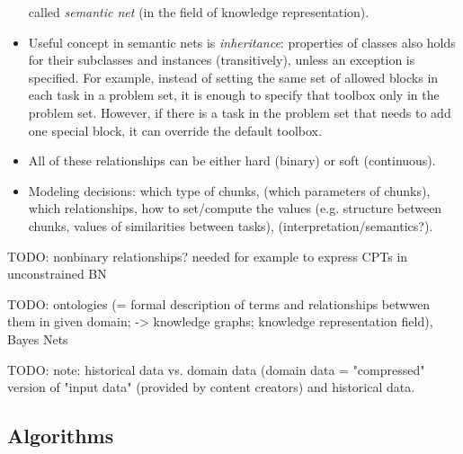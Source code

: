 \begin{itemize}
  called \emph{semantic net} (in the field of knowledge representation).
\item Useful concept in semantic nets is \emph{inheritance}:
  properties of classes also holds for their subclasses and instances (transitively),
  unless an exception is specified.
  For example, instead of setting the same set of allowed blocks in each task
    in a problem set, it is enough to specify that toolbox only in the problem set.
    However, if there is a task in the problem set that needs to add one special block,
    it can override the default toolbox.
\item All of these relationships can be either hard (binary) or soft (continuous).
\item Modeling decisions: which type of chunks, (which parameters of chunks),
  which relationships, how to set/compute the values (e.g. structure between
  chunks, values of similarities between tasks), (interpretation/semantics?).
\end{itemize}

TODO: nonbinary relationships? needed for example to express CPTs in unconstrained BN

TODO: ontologies (= formal description of terms and relationships betwwen them
in given domain; -> knowledge graphs; knowledge representation field), Bayes Nets

TODO: note: historical data vs. domain data (domain data = "compressed" version of
  "input data" (provided by content creators) and historical data.

\subsection{Algorithms}

